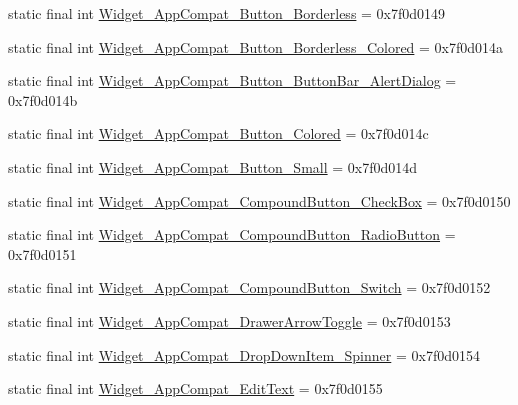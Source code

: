 \begin{DoxyCompactItemize}
\item 
static final int \mbox{\hyperlink{classandroid_1_1support_1_1v7_1_1appcompat_1_1R_1_1style_a5539248d2625f20d83f4a1f93cc576b2}{Widget\+\_\+\+App\+Compat\+\_\+\+Button\+\_\+\+Borderless}} = 0x7f0d0149
\item 
static final int \mbox{\hyperlink{classandroid_1_1support_1_1v7_1_1appcompat_1_1R_1_1style_a610a30199ff6d78914f732725e62f88d}{Widget\+\_\+\+App\+Compat\+\_\+\+Button\+\_\+\+Borderless\+\_\+\+Colored}} = 0x7f0d014a
\item 
static final int \mbox{\hyperlink{classandroid_1_1support_1_1v7_1_1appcompat_1_1R_1_1style_a9caf7ffbeb017b5b7c700450aeb0e09f}{Widget\+\_\+\+App\+Compat\+\_\+\+Button\+\_\+\+Button\+Bar\+\_\+\+Alert\+Dialog}} = 0x7f0d014b
\item 
static final int \mbox{\hyperlink{classandroid_1_1support_1_1v7_1_1appcompat_1_1R_1_1style_aa5cdb819e242c5005d54d0431f3e9d60}{Widget\+\_\+\+App\+Compat\+\_\+\+Button\+\_\+\+Colored}} = 0x7f0d014c
\item 
static final int \mbox{\hyperlink{classandroid_1_1support_1_1v7_1_1appcompat_1_1R_1_1style_a021c9d5ac246c4c6c0cc59f83d925439}{Widget\+\_\+\+App\+Compat\+\_\+\+Button\+\_\+\+Small}} = 0x7f0d014d
\item 
static final int \mbox{\hyperlink{classandroid_1_1support_1_1v7_1_1appcompat_1_1R_1_1style_a816734eecf98d5be30371c10bbdebcaf}{Widget\+\_\+\+App\+Compat\+\_\+\+Compound\+Button\+\_\+\+Check\+Box}} = 0x7f0d0150
\item 
static final int \mbox{\hyperlink{classandroid_1_1support_1_1v7_1_1appcompat_1_1R_1_1style_a84b6c8ceee6e9b5a6314f7869f841202}{Widget\+\_\+\+App\+Compat\+\_\+\+Compound\+Button\+\_\+\+Radio\+Button}} = 0x7f0d0151
\item 
static final int \mbox{\hyperlink{classandroid_1_1support_1_1v7_1_1appcompat_1_1R_1_1style_a9edca8cda8d4a4ec1a52c2e61195d1cd}{Widget\+\_\+\+App\+Compat\+\_\+\+Compound\+Button\+\_\+\+Switch}} = 0x7f0d0152
\item 
static final int \mbox{\hyperlink{classandroid_1_1support_1_1v7_1_1appcompat_1_1R_1_1style_a3414cd0dee8049b32bc8ffaf55ed8808}{Widget\+\_\+\+App\+Compat\+\_\+\+Drawer\+Arrow\+Toggle}} = 0x7f0d0153
\item 
static final int \mbox{\hyperlink{classandroid_1_1support_1_1v7_1_1appcompat_1_1R_1_1style_ac00c6268b87ac497649f5ad831be1f99}{Widget\+\_\+\+App\+Compat\+\_\+\+Drop\+Down\+Item\+\_\+\+Spinner}} = 0x7f0d0154
\item 
static final int \mbox{\hyperlink{classandroid_1_1support_1_1v7_1_1appcompat_1_1R_1_1style_a144c07042a4fb9247342c0f30f15e367}{Widget\+\_\+\+App\+Compat\+\_\+\+Edit\+Text}} = 0x7f0d0155

\end{DoxyCompactItemize}
